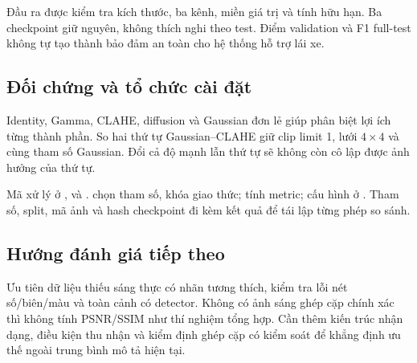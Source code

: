 Đầu ra được kiểm tra kích thước, ba kênh, miền giá trị và tính hữu hạn. Ba checkpoint giữ nguyên, không thích nghi theo test. Điểm validation và F1 full-test không tự tạo thành bảo đảm an toàn cho hệ thống hỗ trợ lái xe.

\subsection{Đối chứng và tổ chức cài đặt}
Identity, Gamma, CLAHE, diffusion và Gaussian đơn lẻ giúp phân biệt lợi ích từng thành phần. So hai thứ tự Gaussian--CLAHE giữ clip limit 1, lưới $4\times4$ và cùng tham số Gaussian. Đổi cả độ mạnh lẫn thứ tự sẽ không còn cô lập được ảnh hưởng của thứ tự.

Mã xử lý ở ,  và .  chọn tham số, khóa giao thức;  tính metric; cấu hình ở . Tham số, split, mã ảnh và hash checkpoint đi kèm kết quả để tái lập từng phép so sánh.

\subsection{Hướng đánh giá tiếp theo}
Ưu tiên dữ liệu thiếu sáng thực có nhãn tương thích, kiểm tra lỗi nét số/biên/màu và toàn cảnh có detector. Không có ảnh sáng ghép cặp chính xác thì không tính PSNR/SSIM như thí nghiệm tổng hợp. Cần thêm kiến trúc nhận dạng, điều kiện thu nhận và kiểm định ghép cặp có kiểm soát để khẳng định ưu thế ngoài trung bình mô tả hiện tại.
